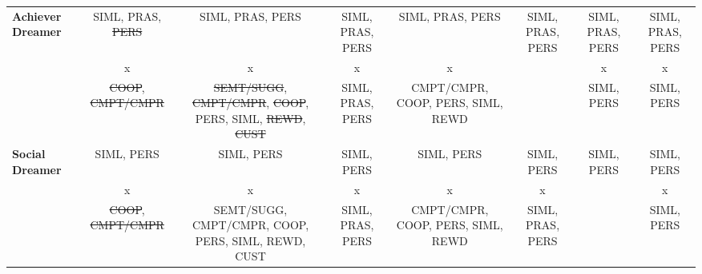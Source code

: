 \begin{landscape}
\begin{tabular}{|l|c|c|c|c|c|c|c|}
\multirow{3}{*}{\textbf{Achiever Dreamer}}& 
\multicolumn{1}{|p{2.5cm}|}{\centering SIML, PRAS, \st{PERS}}&%
\multicolumn{1}{|p{2.5cm}|}{\centering SIML, PRAS, PERS}&%
\multicolumn{1}{|p{2.5cm}|}{\centering SIML, PRAS, PERS}&%
\multicolumn{1}{|p{2.5cm}|}{\centering SIML, PRAS, PERS}&%
\multicolumn{1}{|p{2.5cm}|}{\centering SIML, PRAS, PERS}&%
\multicolumn{1}{|p{2.5cm}|}{\centering SIML, PRAS, PERS}&%
\multicolumn{1}{|p{2.5cm}|}{\centering SIML, PRAS, PERS}\tabularnewline
& 
\multicolumn{1}{|p{2.5cm}|}{\centering x}&
\multicolumn{1}{|p{2.5cm}|}{\centering x}&
\multicolumn{1}{|p{2.5cm}|}{\centering x}&
\multicolumn{1}{|p{2.5cm}|}{\centering x}&
&
\multicolumn{1}{|p{2.5cm}|}{\centering x}&
\multicolumn{1}{|p{2.5cm}|}{\centering x}\tabularnewline
& 
\multicolumn{1}{|p{2.5cm}|}{\centering \st{COOP}, \st{CMPT/CMPR}}&%
\multicolumn{1}{|p{2.5cm}|}{\centering \mbox{\st{SEMT/SUGG}}, \mbox{\st{CMPT/CMPR}}, \st{COOP}, PERS, SIML, \st{REWD}, \st{CUST}}&%
\multicolumn{1}{|p{2.5cm}|}{\centering SIML, PRAS, PERS}&%
\multicolumn{1}{|p{2.5cm}|}{\centering CMPT/CMPR, COOP, PERS, SIML, REWD}&%
&%
\multicolumn{1}{|p{2.5cm}|}{\centering SIML, PERS}&%
\multicolumn{1}{|p{2.5cm}|}{\centering SIML, PERS}\tabularnewline
\hline

\multirow{3}{*}{\textbf{Social Dreamer}}& 
\multicolumn{1}{|p{2.5cm}|}{\centering SIML, PERS}&%
\multicolumn{1}{|p{2.5cm}|}{\centering SIML, PERS}&%
\multicolumn{1}{|p{2.5cm}|}{\centering SIML, PERS}&%
\multicolumn{1}{|p{2.5cm}|}{\centering SIML, PERS}&%
\multicolumn{1}{|p{2.5cm}|}{\centering SIML, PERS}&%
\multicolumn{1}{|p{2.5cm}|}{\centering SIML, PERS}&%
\multicolumn{1}{|p{2.5cm}|}{\centering SIML, PERS}\tabularnewline
& 
\multicolumn{1}{|p{2.5cm}|}{\centering x}&
\multicolumn{1}{|p{2.5cm}|}{\centering x}&
\multicolumn{1}{|p{2.5cm}|}{\centering x}&
\multicolumn{1}{|p{2.5cm}|}{\centering x}&
\multicolumn{1}{|p{2.5cm}|}{\centering x}&
&
\multicolumn{1}{|p{2.5cm}|}{\centering x}\tabularnewline
& 
\multicolumn{1}{|p{2.5cm}|}{\centering \st{COOP}, \st{CMPT/CMPR}}&%
\multicolumn{1}{|p{2.5cm}|}{\centering \mbox{SEMT/SUGG}, \mbox{CMPT/CMPR}, COOP, PERS, SIML, REWD, CUST}&%
\multicolumn{1}{|p{2.5cm}|}{\centering SIML, PRAS, PERS}&%
\multicolumn{1}{|p{2.5cm}|}{\centering CMPT/CMPR, COOP, PERS, SIML, REWD}&%
\multicolumn{1}{|p{2.5cm}|}{\centering SIML, PRAS, PERS}&%
&%
\multicolumn{1}{|p{2.5cm}|}{\centering SIML, PERS}\tabularnewline
\hline


\end{tabular}
\end{landscape}
